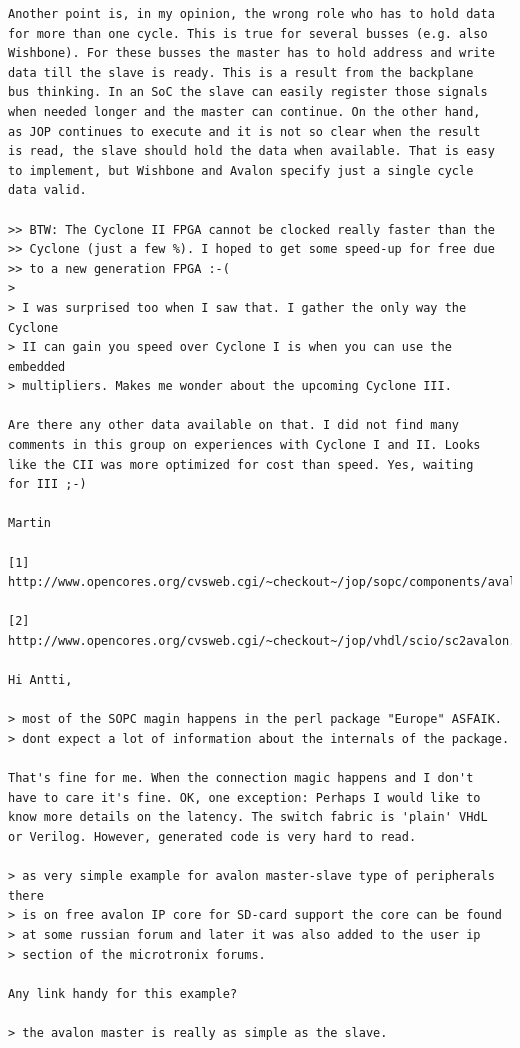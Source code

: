 \documentclass[a4paper,12pt]{scrartcl}
\begin{document}
\begin{verbatim}
Another point is, in my opinion, the wrong role who has to hold data
for more than one cycle. This is true for several busses (e.g. also
Wishbone). For these busses the master has to hold address and write
data till the slave is ready. This is a result from the backplane
bus thinking. In an SoC the slave can easily register those signals
when needed longer and the master can continue. On the other hand,
as JOP continues to execute and it is not so clear when the result
is read, the slave should hold the data when available. That is easy
to implement, but Wishbone and Avalon specify just a single cycle
data valid.

>> BTW: The Cyclone II FPGA cannot be clocked really faster than the
>> Cyclone (just a few %). I hoped to get some speed-up for free due
>> to a new generation FPGA :-(
>
> I was surprised too when I saw that. I gather the only way the Cyclone
> II can gain you speed over Cyclone I is when you can use the embedded
> multipliers. Makes me wonder about the upcoming Cyclone III.

Are there any other data available on that. I did not find many
comments in this group on experiences with Cyclone I and II. Looks
like the CII was more optimized for cost than speed. Yes, waiting
for III ;-)

Martin

[1]
http://www.opencores.org/cvsweb.cgi/~checkout~/jop/sopc/components/avalon_test_slave/hdl/avalon_test_slave.vhd

[2]
http://www.opencores.org/cvsweb.cgi/~checkout~/jop/vhdl/scio/sc2avalon.vhd

Hi Antti,

> most of the SOPC magin happens in the perl package "Europe" ASFAIK.
> dont expect a lot of information about the internals of the package.

That's fine for me. When the connection magic happens and I don't
have to care it's fine. OK, one exception: Perhaps I would like to
know more details on the latency. The switch fabric is 'plain' VHdL
or Verilog. However, generated code is very hard to read.

> as very simple example for avalon master-slave type of peripherals there
> is on free avalon IP core for SD-card support the core can be found
> at some russian forum and later it was also added to the user ip
> section of the microtronix forums.

Any link handy for this example?

> the avalon master is really as simple as the slave.


\end{verbatim}
\end{document}
